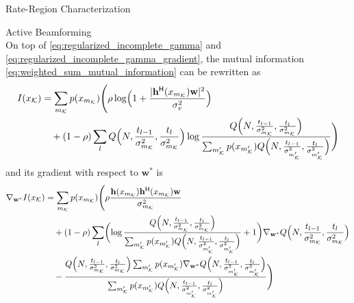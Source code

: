 \begin{section}{Rate-Region Characterization}
\begin{subsection}{Active Beamforming}
\begin{equation}
			\label{eq:regularized_incomplete_gamma_gradient_component}
		\end{equation}
		On top of \eqref{eq:regularized_incomplete_gamma} and \eqref{eq:regularized_incomplete_gamma_gradient}, the mutual information \eqref{eq:weighted_sum_mutual_information} can be rewritten as
		\begin{equation}
			\begin{split}
				I(x_{\mathcal{K}})
				& =\sum_{m_{\mathcal{K}}}p(x_{m_{\mathcal{K}}})\Biggl(\rho\log\Bigl(1+\frac{\lvert\mathbf{h}^\mathsf{H}(x_{m_{\mathcal{K}}})\mathbf{w}\rvert^2}{\sigma_v^2}\Bigr)\\
				& \quad +(1-\rho)\sum_l Q\Bigl(N,\frac{t_{l-1}}{\sigma_{m_{\mathcal{K}}}^2},\frac{t_l}{\sigma_{m_{\mathcal{K}}}^2}\Bigr) \log \frac{Q\Bigl(N,\frac{t_{l-1}}{\sigma_{m_{\mathcal{K}}}^2},\frac{t_l}{\sigma_{m_{\mathcal{K}}}^2}\Bigr)}{\sum_{m_{\mathcal{K}}'} p(x_{m_{\mathcal{K}}'}) Q\Bigl(N,\frac{t_{l-1}}{\sigma_{m_{\mathcal{K}}'}^2},\frac{t_l}{\sigma_{m_{\mathcal{K}}'}^2}\Bigr)}\Biggr)
				\label{eq:weighted_sum_mutual_information_explicit}
			\end{split}
		\end{equation}
		and its gradient with respect to $\mathbf{w}^*$ is
		\begin{equation}
			\begin{split}
				\nabla_{\mathbf{w}^*} I(x_{\mathcal{K}})
				& = \sum_{m_{\mathcal{K}}}p(x_{m_{\mathcal{K}}})\Biggl(\rho\frac{\mathbf{h}(x_{m_{\mathcal{K}}})\mathbf{h}^\mathsf{H}(x_{m_{\mathcal{K}}})\mathbf{w}}{\sigma_{m_{\mathcal{K}}}^2}\\
				& \quad +(1-\rho)\sum_l\biggl(\log\frac{Q\Bigl(N,\frac{t_{l-1}}{\sigma_{m_{\mathcal{K}}}^2},\frac{t_l}{\sigma_{m_{\mathcal{K}}}^2}\Bigr)}{\sum_{m_{\mathcal{K}}'}p(x_{m_{\mathcal{K}}'})Q\Bigl(N,\frac{t_{l-1}}{\sigma_{m_{\mathcal{K}}'}^2},\frac{t_l}{\sigma_{m_{\mathcal{K}}'}^2}\Bigr)}+1\biggr) \nabla_{\mathbf{w}^*} Q\Bigl(N,\frac{t_{l-1}}{\sigma_{m_{\mathcal{K}}}^2},\frac{t_l}{\sigma_{m_{\mathcal{K}}}^2}\Bigr)\\
				& \quad -\frac{Q\Bigl(N,\frac{t_{l-1}}{\sigma_{m_{\mathcal{K}}}^2},\frac{t_l}{\sigma_{m_{\mathcal{K}}}^2}\Bigr)\sum_{m_{\mathcal{K}}'}p(x_{m_{\mathcal{K}}'})\nabla_{\mathbf{w}^*}Q\Bigl(N,\frac{t_{l-1}}{\sigma_{m_{\mathcal{K}}'}^2},\frac{t_l}{\sigma_{m_{\mathcal{K}}'}^2}\Bigr)}{\sum_{m_{\mathcal{K}}'}p(x_{m_{\mathcal{K}}'})Q\Bigl(N,\frac{t_{l-1}}{\sigma_{m_{\mathcal{K}}'}^2},\frac{t_l}{\sigma_{m_{\mathcal{K}}'}^2}\Bigr)}\Biggr)
				\label{eq:weighted_sum_mutual_information_gradient}

\end{split}
\end{equation}
\end{subsection}
\end{section}
